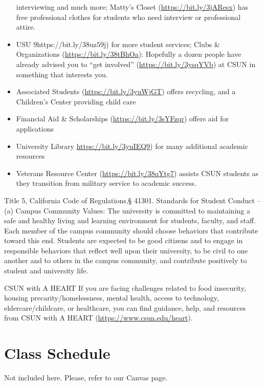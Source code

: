 \documentclass[11pt,]{article}
\begin{document}
\begin{itemize}
  interviewing and much more; Matty's Closet
  (\url{https://bit.ly/3jAResx}) has free professional clothes for
  students who need interview or professional attire.
\item
  USU 9https://bit.ly/38uz59j) for more student services; Clubs \&
  Organizations (\url{https://bit.ly/38tBhOa}): Hopefully a dozen people
  have already advised you to ``get involved''
  (\url{https://bit.ly/3ysqYVb}) at CSUN in something that interests
  you.
\item
  Associated Students (\url{https://bit.ly/3yuWjGT}) offers recycling,
  and a Children's Center providing child care
\item
  Financial Aid \& Scholarships (\url{https://bit.ly/3sYFzqr}) offers
  aid for applications
\item
  University Library \url{https://bit.ly/3yuIEQ9}) for many additional
  academic resources
\item
  Veterans Resource Center (\url{https://bit.ly/38qYtg7}) assists CSUN
  students as they transition from military service to academic success.
\end{itemize}

Title 5, California Code of Regulations,§ 41301. Standards for Student
Conduct -- (a) Campus Community Values: The university is committed to
maintaining a safe and healthy living and learning environment for
students, faculty, and staff. Each member of the campus community should
choose behaviors that contribute toward this end. Students are expected
to be good citizens and to engage in responsible behaviors that reflect
well upon their university, to be civil to one another and to others in
the campus community, and contribute positively to student and
university life.

CSUN with A HEART If you are facing challenges related to food
insecurity, housing precarity/homelessness, mental health, access to
technology, eldercare/childcare, or healthcare, you can find guidance,
help, and resources from CSUN with A HEART
(\url{https://www.csun.edu/heart}).

\hypertarget{class-schedule}{%
\section{Class Schedule}\label{class-schedule}}

Not included here. Please, refer to our Canvas page.
\end{document}
